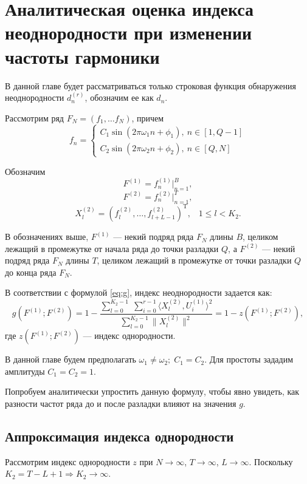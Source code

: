 \documentclass[specialist, substylefile = spbu.rtx,
			   subf, href, 12pt]{disser}
\begin{document}
\newpage
\chapter{Аналитическая оценка индекса неоднородности при изменении частоты гармоники} \label{sec:ch_4}
В данной главе будет рассматриваться только строковая функция обнаружения неоднородности $ d_n^{(r)} $, обозначим ее как $ d_n $.

Рассмотрим ряд $ F_N = (f_1, \dots f_{N}) $, причем  
\begin{equation*} 
	f_n = 
	\begin{cases} 
		C_1\sin(2\pi\omega_1 n + \phi_1),\ n \in [1, Q-1] \\ 
		C_2\sin(2\pi\omega_2 n + \phi_2),\ n \in [Q, N] 
	\end{cases} 
\end{equation*} 

Обозначим 
$$ F^{(1)} = f_n^{(1)}|_{n=1}^{B}, $$
$$ F^{(2)} = f_n^{(2)}|_{n=1}^{T}, $$
$$X_l^{(2)} = (f_{l}^{(2)}, \dotsc, f_{l+L-1}^{(2)})^\mathrm{T}, \;\;\; 1 \leq l < K_2.$$

В обозначениях выше, $ F^{(1)} $ --- некий подряд ряда $ F_N $ длины $ B $, целиком лежащий в промежутке от начала ряда до точки разладки $ Q $, а  $ F^{(2)} $ --- некий подряд ряда $ F_N $ длины $ T $, целиком лежащий в промежутке от точки разладки $ Q $ до конца ряда $ F_N $. 


В соответствии с формулой \eqref{eq:g}, индекс неоднородности задается как:
$$ g(F^{(1)}; F^{(2)}) = 1 - \frac{\sum\limits_{l=0}^{K_2-1}\;\sum\limits_{i=0}^{r-1}\langle X_l^{(2)}, U_i^{(1)}\rangle^2}{\sum\limits_{l=0}^{K_2-1}\|X_l^{(2)}\|^2} = 1 - z(F^{(1)}; F^{(2)}),  $$
где $ z(F^{(1)}; F^{(2)}) $ --- индекс однородности.

В данной главе будем предполагать $ \omega_1 \neq \omega_2;\; C_1 = C_2 $. Для простоты зададим амплитуды $ C_1 = C_2 = 1 $.

Попробуем аналитически упростить данную формулу, чтобы явно увидеть, как разности частот ряда до и после разладки влияют на значения $ g $.

\section{Аппроксимация индекса однородности}
Рассмотрим индекс однородности $ z $ при $ N \rightarrow \infty $, $ T \rightarrow \infty $, $ L \rightarrow \infty $. Поскольку $ K_2 = T - L + 1 \Rightarrow K_2 \rightarrow \infty $.
\end{document}

